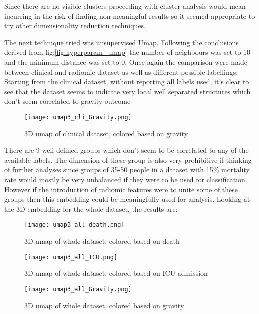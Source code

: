 Since there are no visible clusters proceeding with cluster analysis would mean incurring in the risk of finding non meaningful results so it seemed appropriate to try other dimensionality reduction techniques.

The next technique tried was unsupervised Umap. Following the conclusions derived from fig:\ref{fig:hyperparam_umap} the number of neighbours was set to 10 and the minimum distance was set to 0.
Once again the comparison were made between clinical and radiomic dataset as well as different possible labellings. 
Starting from the clinical dataset, without reporting all labels used, it's clear to see that the dataset seems to indicate very local well separated structures which don't seem correlated to gravity outcome

\begin{figure}[htbp]
  		\texttt{[image: umap3\_cli\_Gravity.png]}\label{umap3_cli_gravity}
          \caption{3D umap of clinical dataset, colored based on gravity}
\end{figure}

There are 9 well defined groups which don't seem to be correlated to any of the available labels. 
The dimension of these group is also very prohibitive if thinking of further analyses since groups of 35-50 people in a dataset with 15$\%$ mortality rate would mostly be very unbalanced if they were to be used for classification.
However if the introduction of radiomic features were to unite some of these groups then this embedding could be meaningfully used for analysis. 
Looking at the 3D embedding for the whole dataset, the results are:

\begin{figure}[htbp]
  		\texttt{[image: umap3\_all\_death.png]}\label{umap3_all_death}
          \caption{3D umap of whole dataset, colored based on death}
\end{figure}

\begin{figure}[htbp]
  		\texttt{[image: umap3\_all\_ICU.png]}\label{umap3_all_ICU}
          \caption{3D umap of whole dataset, colored based on ICU admission}
\end{figure}

\begin{figure}[htbp]
  		\texttt{[image: umap3\_all\_Gravity.png]}\label{umap3_all_Gravity}
          \caption{3D umap of whole dataset, colored based on gravity}
\end{figure}

